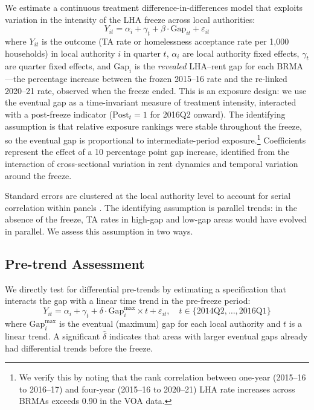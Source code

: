 \documentclass[12pt]{article}
\begin{document}
We estimate a continuous treatment difference-in-differences model that exploits variation in the intensity of the LHA freeze across local authorities:
\begin{equation}
Y_{it} = \alpha_i + \gamma_t + \beta \cdot \text{Gap}_{it} + \varepsilon_{it}
\label{eq:did}
\end{equation}
where $Y_{it}$ is the outcome (TA rate or homelessness acceptance rate per 1,000 households) in local authority $i$ in quarter $t$, $\alpha_i$ are local authority fixed effects, $\gamma_t$ are quarter fixed effects, and $\text{Gap}_i$ is the \textit{revealed} LHA--rent gap for each BRMA---the percentage increase between the frozen 2015--16 rate and the re-linked 2020--21 rate, observed when the freeze ended. This is an exposure design: we use the eventual gap as a time-invariant measure of treatment intensity, interacted with a post-freeze indicator ($\text{Post}_t = 1$ for 2016Q2 onward). The identifying assumption is that relative exposure rankings were stable throughout the freeze, so the eventual gap is proportional to intermediate-period exposure.\footnote{We verify this by noting that the rank correlation between one-year (2015--16 to 2016--17) and four-year (2015--16 to 2020--21) LHA rate increases across BRMAs exceeds 0.90 in the VOA data.} Coefficients represent the effect of a 10 percentage point gap increase, identified from the interaction of cross-sectional variation in rent dynamics and temporal variation around the freeze.

Standard errors are clustered at the local authority level to account for serial correlation within panels \citep{callawaysantanna2021}. The identifying assumption is parallel trends: in the absence of the freeze, TA rates in high-gap and low-gap areas would have evolved in parallel. We assess this assumption in two ways.

\subsection{Pre-trend Assessment}

We directly test for differential pre-trends by estimating a specification that interacts the gap with a linear time trend in the pre-freeze period:
\begin{equation}
Y_{it} = \alpha_i + \gamma_t + \delta \cdot \text{Gap}^{\max}_{i} \times t + \varepsilon_{it}, \quad t \in \{2014\text{Q2}, \ldots, 2016\text{Q1}\}
\label{eq:pretrend}
\end{equation}
where $\text{Gap}^{\max}_{i}$ is the eventual (maximum) gap for each local authority and $t$ is a linear trend. A significant $\hat{\delta}$ indicates that areas with larger eventual gaps already had differential trends before the freeze.
\end{document}

